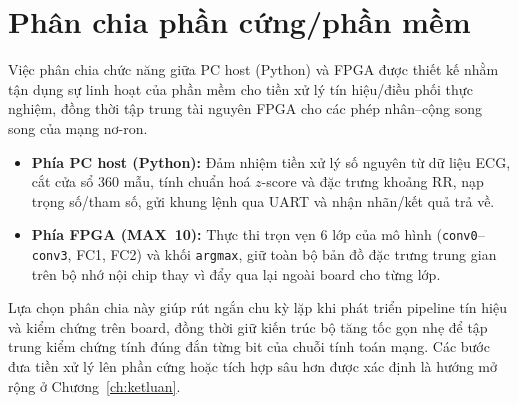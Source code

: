 \section{Phân chia phần cứng/phần mềm}\label{sec:hwsw}

Việc phân chia chức năng giữa PC host (Python) và FPGA được thiết kế nhằm tận dụng sự linh hoạt của phần mềm cho tiền xử lý tín hiệu/điều phối thực nghiệm, đồng thời tập trung tài nguyên FPGA cho các phép nhân--cộng song song của mạng nơ-ron.

\begin{itemize}
	\item \textbf{Phía PC host (Python):} Đảm nhiệm tiền xử lý số nguyên từ dữ liệu ECG, cắt cửa sổ $360$ mẫu, tính chuẩn hoá $z$-score và đặc trưng khoảng RR, nạp trọng số/tham số, gửi khung lệnh qua UART và nhận nhãn/kết quả trả về.
	\item \textbf{Phía FPGA (MAX~10):} Thực thi trọn vẹn $6$ lớp của mô hình (\texttt{conv0}--\texttt{conv3}, FC1, FC2) và khối \texttt{argmax}, giữ toàn bộ bản đồ đặc trưng trung gian trên bộ nhớ nội chip thay vì đẩy qua lại ngoài board cho từng lớp.
\end{itemize}

Lựa chọn phân chia này giúp rút ngắn chu kỳ lặp khi phát triển pipeline tín hiệu và kiểm chứng trên board, đồng thời giữ kiến trúc bộ tăng tốc gọn nhẹ để tập trung kiểm chứng tính đúng đắn từng bit của chuỗi tính toán mạng. Các bước đưa tiền xử lý lên phần cứng hoặc tích hợp sâu hơn được xác định là hướng mở rộng ở Chương~\ref{ch:ketluan}.
